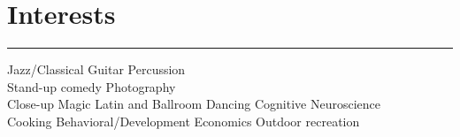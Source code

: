 \documentclass[]{dafirebanks-resume-openfont}
\begin{document}
\begin{minipage}[t]{0.33\textwidth}
\sectionsep


\section{Interests}
\vspace{-3pt}
{\color{blue}\hrule width 78pt \vspace{5pt}}
Jazz/Classical Guitar \textbullet{} Percussion\\
\textbullet{} Stand-up comedy
\textbullet{} Photography\\ 
\textbullet{} Close-up Magic
\textbullet{} Latin and Ballroom Dancing \textbullet{} Cognitive Neuroscience\\
\textbullet{} Cooking 
\textbullet{} Behavioral/Development Economics  
\textbullet{} Outdoor recreation

%
%

\end{minipage} 
\hfill
\end{document}
